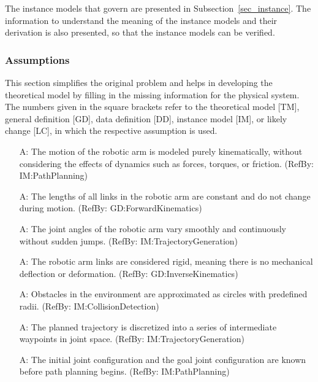 \documentclass[12pt]{article}
\newcounter{assumpnum} %
\begin{document}
The instance models that govern \progname{} are presented in
Subsection~\ref{sec_instance}.  The information to understand the meaning of the
instance models and their derivation is also presented, so that the instance
models can be verified.

\subsubsection{Assumptions} \label{sec_assumpt}


This section simplifies the original problem and helps in developing the
theoretical model by filling in the missing information for the physical system.
The numbers given in the square brackets refer to the theoretical model [TM],
general definition [GD], data definition [DD], instance model [IM], or likely
change [LC], in which the respective assumption is used.

\begin{itemize}

  \item[A\refstepcounter{assumpnum}\theassumpnum \label{A_KinematicMotionOnly}:] 
  The motion of the robotic arm is modeled purely kinematically, without considering the effects of dynamics such as forces, torques, or friction. (RefBy: IM:PathPlanning)

\item[A\refstepcounter{assumpnum}\theassumpnum \label{A_LinkLengthsConstant}:] 
  The lengths of all links in the robotic arm are constant and do not change during motion. (RefBy: GD:ForwardKinematics)

\item[A\refstepcounter{assumpnum}\theassumpnum \label{A_JointMotionContinuous}:] 
  The joint angles of the robotic arm vary smoothly and continuously without sudden jumps. (RefBy: IM:TrajectoryGeneration)

\item[A\refstepcounter{assumpnum}\theassumpnum \label{A_NoMechanicalDeflection}:] 
  The robotic arm links are considered rigid, meaning there is no mechanical deflection or deformation. (RefBy: GD:InverseKinematics)

\item[A\refstepcounter{assumpnum}\theassumpnum \label{A_ObstacleShapeCircular}:] 
  Obstacles in the environment are approximated as circles with predefined radii. (RefBy: IM:CollisionDetection)

\item[A\refstepcounter{assumpnum}\theassumpnum \label{A_TrajectoryDiscretized}:] 
  The planned trajectory is discretized into a series of intermediate waypoints in joint space. (RefBy: IM:TrajectoryGeneration)

\item[A\refstepcounter{assumpnum}\theassumpnum \label{A_InitialAndGoalConfigurationsKnown}:] 
  The initial joint configuration and the goal joint configuration are known before path planning begins. (RefBy: IM:PathPlanning)

\end{itemize}
\end{document}
